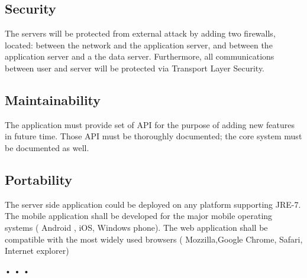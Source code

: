   \subsection{Security}
  The servers will be protected from external attack by adding two firewalls, located: between the network and the application server, 
  and between the application server and a the data server.
  Furthermore, all communications between user and server will be protected via Transport Layer Security.
  \subsection{Maintainability}
  The application must provide set of API for the purpose of adding new features in future time.
  Those API must be thoroughly documented; the core system must be documented as well.
  \subsection{Portability}
  The server side application could be deployed on any platform supporting JRE-7.\\
  The mobile application shall be developed for the major mobile operating systems ( Android , iOS, Windows phone).
  The web application shall be compatible with the most widely used browsers ( Mozzilla,Google Chrome, Safari, Internet explorer) %
  
 • • •
                                                                                                                                                                                                                                                                                                                                                                                                                                                                                                                                                                                                                                                                                                                                                                                                                                                                                                                                                                                                                                                                                                                  
